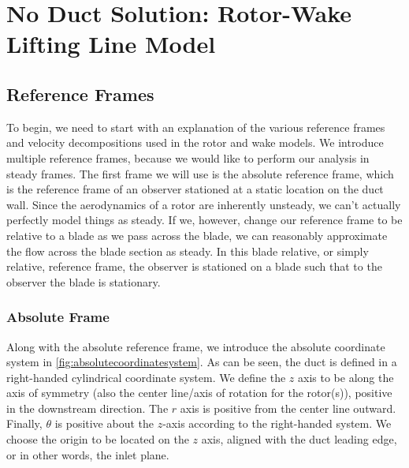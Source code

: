 \clearpage
\newpage
\section{No Duct Solution: Rotor-Wake Lifting Line Model}
\label{sec:rotorwakemethods}

%
%

\subsection{Reference Frames}
\label{ssec:reference_frames}
To begin, we need to start with an explanation of the various reference frames and velocity decompositions used in the rotor and wake models.
%
We introduce multiple reference frames, because we would like to perform our analysis in steady frames.
%
The first frame we will use is the absolute reference frame, which is the reference frame of an observer stationed at a static location on the duct wall.
%
Since the aerodynamics of a rotor are inherently unsteady, we can't actually perfectly model things as steady.
%
If we, however, change our reference frame to be relative to a blade as we pass across the blade, we can reasonably approximate the flow across the blade section as steady.
%
In this blade relative, or simply relative, reference frame, the observer is stationed on a blade such that to the observer the blade is stationary.

\subsubsection{Absolute Frame}
\label{ssec:absoluteframe}

Along with the absolute reference frame, we introduce the absolute coordinate system in \cref{fig:absolutecoordinatesystem}.
%
As can be seen, the duct is defined in a right-handed cylindrical coordinate system.
%
We define the \(z\) axis to be along the axis of symmetry (also the center line/axis of rotation for the rotor(s)), positive in the downstream direction.
%
The \(r\) axis is positive from the center line outward.
%
Finally, \(\theta\) is positive about the \(z\)-axis according to the right-handed system.
%
%
We choose the origin to be located on the \(z\) axis, aligned with the duct leading edge, or in other words, the inlet plane.

